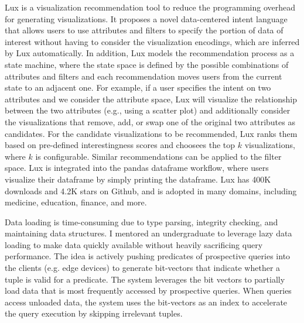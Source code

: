 \documentclass[10pt]{article} %
\begin{document}
{Lux is a visualization recommendation tool to reduce the programming overhead for generating visualizations. 
It proposes a novel data-centered intent language that 
allows users to use attributes and filters to specify the portion of data of interest 
without having to consider the visualization encodings, which are inferred by Lux automatically. 
In addition, Lux models the recommendation process as a state machine, 
where the state space is defined by the possible combinations 
of attributes and filters and each recommendation moves users from the current state to an adjacent one. 
For example, if a user specifies the intent on two attributes and we consider the attribute space, 
Lux will visualize the relationship between the two attributes 
(e.g., using a scatter plot) and additionally consider the visualizations that remove, add, or swap one 
of the original two attributes as candidates. For the candidate visualizations to be recommended, 
Lux ranks them based on pre-defined interestingness scores and choosees the top $k$ visualizations, 
where $k$ is configurable. Similar recommendations can be applied to the filter space. 
Lux is integrated into the pandas dataframe workflow, where users visualize their dataframe 
by simply printing the dataframe. Lux has 400K downloads and 4.2K stars on Github, 
and is adopted in many domains, including medicine, education, finance, and more.}

{Data loading is time-consuming due to type parsing,  
integrity checking, and maintaining data structures. 
I mentored an undergraduate to leverage 
lazy data loading to make data quickly available 
without heavily sacrificing query performance. 
The idea is actively pushing predicates of prospective queries into 
the clients (e.g. edge devices) 
to generate bit-vectors that indicate whether a tuple 
is valid for a predicate. 
The system leverages the bit vectors 
to partially load data that is most frequently 
accessed by prospective queries. 
When queries access unloaded data, 
the system uses the bit-vectors as an index 
to accelerate the query execution by skipping irrelevant tuples.}
\end{document}
